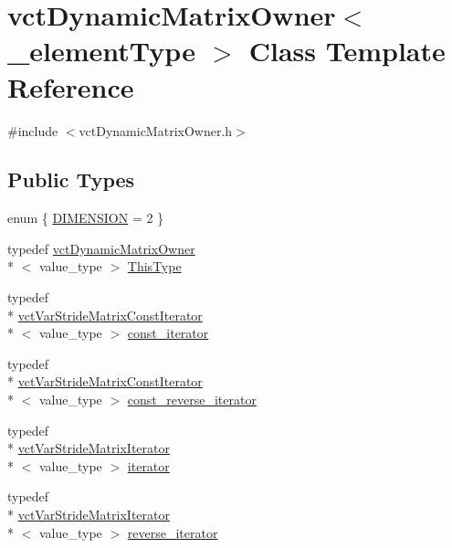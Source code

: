 \hypertarget{classvct_dynamic_matrix_owner}{\section{vct\-Dynamic\-Matrix\-Owner$<$ \-\_\-element\-Type $>$ Class Template Reference}
\label{classvct_dynamic_matrix_owner}
}


{\ttfamily \#include $<$vct\-Dynamic\-Matrix\-Owner.\-h$>$}

\subsection*{Public Types}
\begin{DoxyCompactItemize}
\item 
enum \{ \hyperlink{classvct_dynamic_matrix_owner_ab539c6209377e71938f3be5a0f73aa90a3cbd1d8cbd91b8e603c01551869fb839}{D\-I\-M\-E\-N\-S\-I\-O\-N} = 2
 \}
\item 
typedef \hyperlink{classvct_dynamic_matrix_owner}{vct\-Dynamic\-Matrix\-Owner}\\*
$<$ value\-\_\-type $>$ \hyperlink{classvct_dynamic_matrix_owner_a6e693f28f71b3e0b7f5c62d334f99779}{This\-Type}
\item 
typedef \\*
\hyperlink{classvct_var_stride_matrix_const_iterator}{vct\-Var\-Stride\-Matrix\-Const\-Iterator}\\*
$<$ value\-\_\-type $>$ \hyperlink{classvct_dynamic_matrix_owner_ac83fab5858a222a2debcf2059c9f06e2}{const\-\_\-iterator}
\item 
typedef \\*
\hyperlink{classvct_var_stride_matrix_const_iterator}{vct\-Var\-Stride\-Matrix\-Const\-Iterator}\\*
$<$ value\-\_\-type $>$ \hyperlink{classvct_dynamic_matrix_owner_a3f5a649a5285f9909e4628151d9cdac1}{const\-\_\-reverse\-\_\-iterator}
\item 
typedef \\*
\hyperlink{classvct_var_stride_matrix_iterator}{vct\-Var\-Stride\-Matrix\-Iterator}\\*
$<$ value\-\_\-type $>$ \hyperlink{classvct_dynamic_matrix_owner_aa723836eb06a7ae230e80ec85a44e059}{iterator}
\item 
typedef \\*
\hyperlink{classvct_var_stride_matrix_iterator}{vct\-Var\-Stride\-Matrix\-Iterator}\\*
$<$ value\-\_\-type $>$ \hyperlink{classvct_dynamic_matrix_owner_afa1149b71fe5f3151ee890e65ea7e81b}{reverse\-\_\-iterator}
\end{DoxyCompactItemize}
